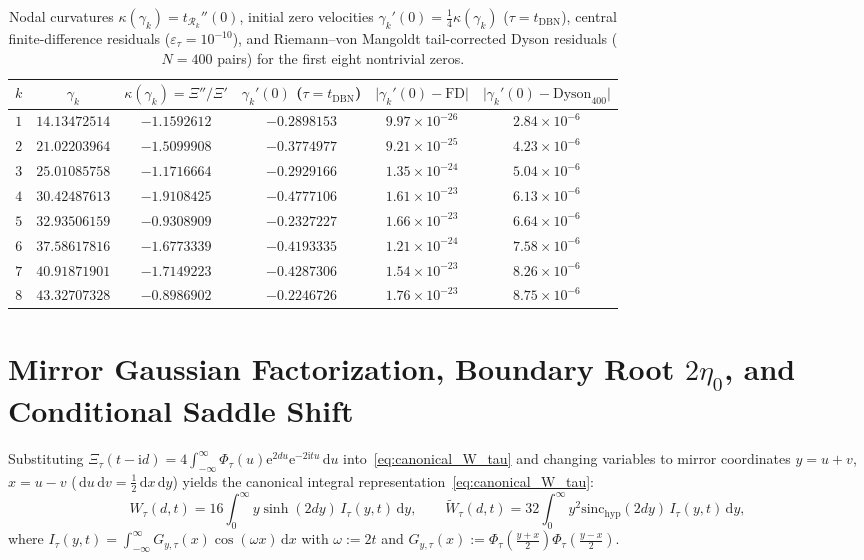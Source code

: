 \documentclass[11pt,reqno]{amsart}
\theoremstyle{plain}
\theoremstyle{definition}
\theoremstyle{remark}
\numberwithin{equation}{section}
\newcommand{\dd}{\,\mathrm{d}}
\newcommand{\ii}{\mathrm{i}}
\newcommand{\ee}{\mathrm{e}}
\newcommand{\sinch}{\mathrm{sinc}_{\mathrm{hyp}}}
\begin{document}
\begin{table}[htbp]
\centering
\caption{Nodal curvatures $\kappa(\gamma_k) = t_{\mathcal{R}_k}''(0)$, initial zero velocities $\gamma_k'(0) = \frac{1}{4}\kappa(\gamma_k)$ ($\tau = t_{\mathrm{DBN}}$), central finite-difference residuals ($\varepsilon_\tau = 10^{-10}$), and Riemann--von Mangoldt tail-corrected Dyson residuals ($N = 400$ pairs) for the first eight nontrivial zeros.}\label{tab:velocities}
\small
\begin{tabular}{@{}rccccc@{}}
\toprule
$k$ & $\gamma_k$ & $\kappa(\gamma_k) = \Xi''/\Xi'$ & $\gamma_k'(0)$ ($\tau = t_{\mathrm{DBN}}$) & $\lvert\gamma_k'(0) - \mathrm{FD}\rvert$ & $\lvert\gamma_k'(0) - \mathrm{Dyson}_{400}\rvert$ \\
\midrule
$1$ & $14.13472514$ & $-1.1592612$ & $-0.2898153$ & $9.97 \times 10^{-26}$ & $2.84 \times 10^{-6}$ \\
$2$ & $21.02203964$ & $-1.5099908$ & $-0.3774977$ & $9.21 \times 10^{-25}$ & $4.23 \times 10^{-6}$ \\
$3$ & $25.01085758$ & $-1.1716664$ & $-0.2929166$ & $1.35 \times 10^{-24}$ & $5.04 \times 10^{-6}$ \\
$4$ & $30.42487613$ & $-1.9108425$ & $-0.4777106$ & $1.61 \times 10^{-23}$ & $6.13 \times 10^{-6}$ \\
$5$ & $32.93506159$ & $-0.9308909$ & $-0.2327227$ & $1.66 \times 10^{-23}$ & $6.64 \times 10^{-6}$ \\
$6$ & $37.58617816$ & $-1.6773339$ & $-0.4193335$ & $1.21 \times 10^{-24}$ & $7.58 \times 10^{-6}$ \\
$7$ & $40.91871901$ & $-1.7149223$ & $-0.4287306$ & $1.54 \times 10^{-23}$ & $8.26 \times 10^{-6}$ \\
$8$ & $43.32707328$ & $-0.8986902$ & $-0.2246726$ & $1.76 \times 10^{-23}$ & $8.75 \times 10^{-6}$ \\
\bottomrule
\end{tabular}
\end{table}

\section{Mirror Gaussian Factorization, Boundary Root $2\eta_0$, and Conditional Saddle Shift}\label{sec:wigner}

Substituting $\Xi_\tau(t - \ii d) = 4\int_{-\infty}^\infty \Phi_\tau(u)\ee^{2du}\ee^{-2\ii tu}\dd u$ into~\eqref{eq:canonical_W_tau} and changing variables to mirror coordinates $y = u + v$, $x = u - v$ ($\dd u\dd v = \frac{1}{2}\dd x\dd y$) yields the canonical integral representation~\eqref{eq:canonical_W_tau}:
\begin{equation}\label{eq:W_tau_canonical_full}
W_\tau(d,t) = 16\int_0^{\infty} y\sinh(2dy)\,I_\tau(y,t)\dd y, \qquad \widetilde{W}_\tau(d,t) = 32\int_0^{\infty} y^2\sinch(2dy)\,I_\tau(y,t)\dd y,
\end{equation}
where $I_\tau(y,t) = \int_{-\infty}^{\infty} G_{y,\tau}(x)\cos(\omega x)\dd x$ with $\omega := 2t$ and $G_{y,\tau}(x) := \Phi_\tau(\frac{y+x}{2})\Phi_\tau(\frac{y-x}{2})$.
\end{document}
